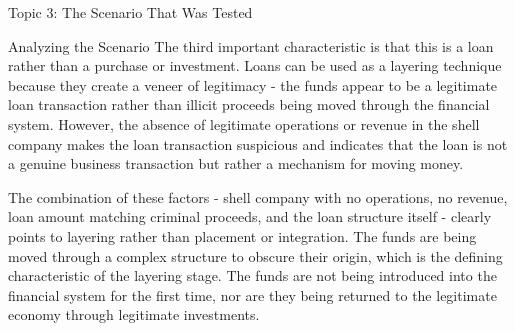 \documentclass[8pt]{beamer}  %
\begin{document}
\begin{frame}{Topic 3: The Scenario That Was Tested}
\begin{block}{\large Analyzing the Scenario}
			The third important characteristic is that this is a loan rather than a purchase or investment. Loans can be used as a layering technique because they create a veneer of legitimacy - the funds appear to be a legitimate loan transaction rather than illicit proceeds being moved through the financial system. However, the absence of legitimate operations or revenue in the shell company makes the loan transaction suspicious and indicates that the loan is not a genuine business transaction but rather a mechanism for moving money.
			
			The combination of these factors - shell company with no operations, no revenue, loan amount matching criminal proceeds, and the loan structure itself - clearly points to layering rather than placement or integration. The funds are being moved through a complex structure to obscure their origin, which is the defining characteristic of the layering stage. The funds are not being introduced into the financial system for the first time, nor are they being returned to the legitimate economy through legitimate investments.
		\end{block}
	\end{frame}
	
\end{document}
